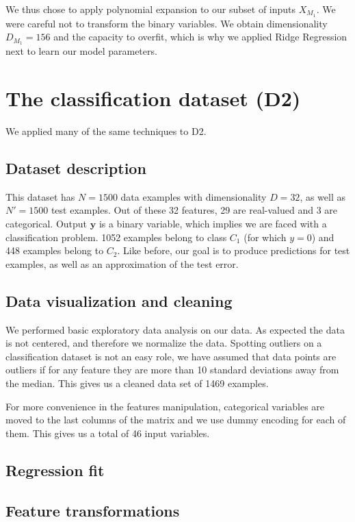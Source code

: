 \documentclass{article} %
\begin{document}
  We thus chose to apply polynomial expansion to our subset of inputs $X_{M_1}$. We were careful not to transform the binary variables. We obtain dimensionality $D_{M_1} = 156$ and the capacity to overfit, which is why we applied Ridge Regression next to learn our model parameters.

\section{The classification dataset (D2)}
  We applied many of the same techniques to D2.

  \subsection{Dataset description}
  This dataset has $N = 1500$ data examples with dimensionality $D = 32$, as well as $N' = 1500$ test examples. Out of these 32 features, 29 are real-valued and 3 are categorical. Output $\mathbf{y}$ is a binary variable, which implies we are faced with a classification problem. 1052 examples belong to class $C_1$ (for which $y = 0$) and 448 examples belong to $C_2$. Like before, our goal is to produce predictions for test examples, as well as an approximation of the test error.

  \subsection{Data visualization and cleaning}
We performed basic exploratory data analysis on our data. As expected the data is not centered, and therefore we normalize the data. Spotting outliers on a classification dataset is not an easy role, we have assumed that data points are outliers if for any feature they are more than 10 standard deviations away from the median. This gives us a cleaned data set of 1469 examples.

For more convenience in the features manipulation, categorical variables are moved to the last columns of the matrix and we use dummy encoding for each of them. This gives us a total of 46 input variables.

  \subsection{Regression fit}

  \subsection{Feature transformations}
\end{document}
